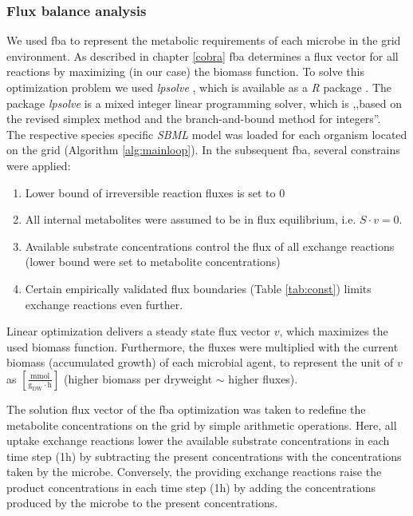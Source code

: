 \subsubsection{Flux balance analysis}
We used fba to represent the metabolic requirements of each microbe in the grid environment.
As described in chapter \ref{cobra} fba determines a flux vector for all reactions by maximizing (in our case) the biomass function.
To solve this optimization problem we used \textit{lpsolve} \cite{lpsolve}, which is available as a \textit{R} package \cite{Rlpsolve}.
The package \textit{lpsolve} is a mixed integer linear programming solver, which is ,,based on the revised simplex method and the branch-and-bound method for integers''\cite{lpsolvedocu}.\\
The respective species specific \textit{SBML} model was loaded for each organism located on the grid (Algorithm \hyperref[alg:mainloop]{\ref{alg:mainloop}}).
In the subsequent fba, several constrains were applied:
\begin{enumerate}
  \item Lower bound of irreversible reaction fluxes is set to $0$
  \item All internal metabolites were assumed to be in flux equilibrium, i.e. $S\cdot v=0$.
  \item Available substrate concentrations control the flux of all exchange reactions (lower bound were set to metabolite concentrations)
  \item Certain empirically validated flux boundaries (Table \hyperref[tab:const]{\ref{tab:const}}) limits exchange reactions even further.
\end{enumerate}
Linear optimization delivers a steady state flux vector $v$, which maximizes the used biomass function. Furthermore, the fluxes were multiplied with the current biomass (accumulated growth) of each microbial agent, to represent the unit of $v$ as $[\frac{\mathrm{mmol}}{\mathrm{g_{DW} \cdot \mathrm{h}}}]$ (higher biomass per dryweight $\sim$ higher fluxes).

The solution flux vector of the fba optimization was taken to redefine the metabolite concentrations on the grid by simple arithmetic operations. Here, all uptake exchange reactions lower the available substrate concentrations in each time step (1\;h) by subtracting the present concentrations with the concentrations taken by the microbe. Conversely, the providing exchange reactions raise the product concentrations in each time step (1\;h) by adding the concentrations produced by the microbe to the present concentrations.


